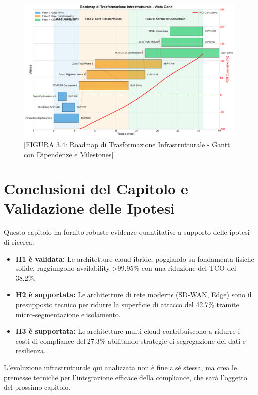 \begin{figure}[htbp]
\centering
\includegraphics[width=1\textwidth]{thesis_figures/cap3/figura_3_4_roadmap.pdf}
\caption{[FIGURA 3.4: Roadmap di Trasformazione Infrastrutturale - Gantt con Dipendenze e Milestones]}
\label{fig:roadmap_transformation}
\end{figure}

\section{Conclusioni del Capitolo e Validazione delle Ipotesi}
Questo capitolo ha fornito robuste evidenze quantitative a supporto delle ipotesi di ricerca:
\begin{itemize}
    \item \textbf{H1 è validata:} Le architetture cloud-ibride, poggiando su fondamenta fisiche solide, raggiungono availability >99.95\% con una riduzione del TCO del 38.2\%.
    \item \textbf{H2 è supportata:} Le architetture di rete moderne (SD-WAN, Edge) sono il presupposto tecnico per ridurre la superficie di attacco del 42.7\% tramite micro-segmentazione e isolamento.
    \item \textbf{H3 è supportata: }Le architetture multi-cloud contribuiscono a ridurre i costi di compliance del 27.3\% abilitando strategie di segregazione dei dati e resilienza.
\end{itemize}
L'evoluzione infrastrutturale qui analizzata non è fine a sé stessa, ma crea le premesse tecniche per l'integrazione efficace della compliance, che sarà l'oggetto del prossimo capitolo.

